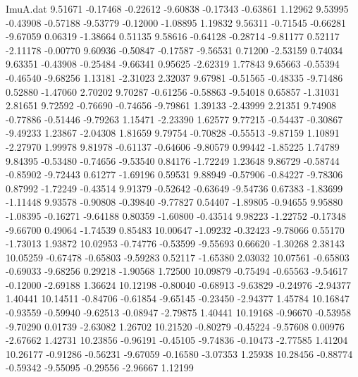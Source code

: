 \begin{filecontents}{ImuA.dat}
   9.51671   -0.17468   -0.22612   -9.60838   -0.17343   -0.63861    1.12962
   9.53995   -0.43908   -0.57188   -9.53779   -0.12000   -1.08895    1.19832
   9.56311   -0.71545   -0.66281   -9.67059    0.06319   -1.38664    0.51135
   9.58616   -0.64128   -0.28714   -9.81177    0.52117   -2.11178   -0.00770
   9.60936   -0.50847   -0.17587   -9.56531    0.71200   -2.53159    0.74034
   9.63351   -0.43908   -0.25484   -9.66341    0.95625   -2.62319    1.77843
   9.65663   -0.55394   -0.46540   -9.68256    1.13181   -2.31023    2.32037
   9.67981   -0.51565   -0.48335   -9.71486    0.52880   -1.47060    2.70202
   9.70287   -0.61256   -0.58863   -9.54018    0.65857   -1.31031    2.81651
   9.72592   -0.76690   -0.74656   -9.79861    1.39133   -2.43999    2.21351
   9.74908   -0.77886   -0.51446   -9.79263    1.15471   -2.23390    1.62577
   9.77215   -0.54437   -0.30867   -9.49233    1.23867   -2.04308    1.81659
   9.79754   -0.70828   -0.55513   -9.87159    1.10891   -2.27970    1.99978
   9.81978   -0.61137   -0.64606   -9.80579    0.99442   -1.85225    1.74789
   9.84395   -0.53480   -0.74656   -9.53540    0.84176   -1.72249    1.23648
   9.86729   -0.58744   -0.85902   -9.72443    0.61277   -1.69196    0.59531
   9.88949   -0.57906   -0.84227   -9.78306    0.87992   -1.72249   -0.43514
   9.91379   -0.52642   -0.63649   -9.54736    0.67383   -1.83699   -1.11448
   9.93578   -0.90808   -0.39840   -9.77827    0.54407   -1.89805   -0.94655
   9.95880   -1.08395   -0.16271   -9.64188    0.80359   -1.60800   -0.43514
   9.98223   -1.22752   -0.17348   -9.66700    0.49064   -1.74539    0.85483
  10.00647   -1.09232   -0.32423   -9.78066    0.55170   -1.73013    1.93872
  10.02953   -0.74776   -0.53599   -9.55693    0.66620   -1.30268    2.38143
  10.05259   -0.67478   -0.65803   -9.59283    0.52117   -1.65380    2.03032
  10.07561   -0.65803   -0.69033   -9.68256    0.29218   -1.90568    1.72500
  10.09879   -0.75494   -0.65563   -9.54617   -0.12000   -2.69188    1.36624
  10.12198   -0.80040   -0.68913   -9.63829   -0.24976   -2.94377    1.40441
  10.14511   -0.84706   -0.61854   -9.65145   -0.23450   -2.94377    1.45784
  10.16847   -0.93559   -0.59940   -9.62513   -0.08947   -2.79875    1.40441
  10.19168   -0.96670   -0.53958   -9.70290    0.01739   -2.63082    1.26702
  10.21520   -0.80279   -0.45224   -9.57608    0.00976   -2.67662    1.42731
  10.23856   -0.96191   -0.45105   -9.74836   -0.10473   -2.77585    1.41204
  10.26177   -0.91286   -0.56231   -9.67059   -0.16580   -3.07353    1.25938
  10.28456   -0.88774   -0.59342   -9.55095   -0.29556   -2.96667    1.12199

\end{filecontents}
